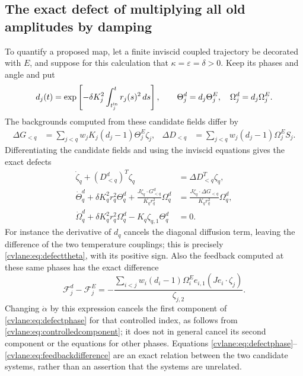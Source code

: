 \subsection{The exact defect of multiplying all old amplitudes by damping}
To quantify a proposed map, let a finite inviscid coupled trajectory
be decorated with $E$, and suppose for this calculation that
$\kappa=\varepsilon=\delta>0$. Keep its phases and angle and put
\[
 d_j(t)=\exp\left[-\delta K_j^2
 \int_{t_j^{\rm in}}^t r_j(s)^2\,ds\right],\qquad
 \Theta_j^d=d_j\Theta_j^E,\quad\Omega_j^d=d_j\Omega_j^E.
\]
The backgrounds computed from these candidate fields differ by
\begin{align}
 \Delta G_{<q}&=\sum_{j<q}w_jK_j(d_j-1)\Theta_j^E\zeta_j,
 &\Delta D_{<q}&=\sum_{j<q}w_j(d_j-1)\Omega_j^ES_j.
 \label{cvlane:eq:dampingdefectbackground}
\end{align}
Differentiating the candidate fields and using the inviscid
equations gives the exact defects
\begin{align}
 \dot\zeta_q+(D^d_{<q})^T\zeta_q
 &=\Delta D_{<q}^T\zeta_q,\label{cvlane:eq:defectphase}\\
 \dot\Theta_q^d+\delta K_q^2r_q^2\Theta_q^d
 +\frac{J\zeta_q\cdot G^d_{<q}}{K_qr_q^2}\Omega_q^d
 &=\frac{J\zeta_q\cdot\Delta G_{<q}}{K_qr_q^2}\Omega_q^d,
 \label{cvlane:eq:defecttheta}\\
 \dot\Omega_q^d+\delta K_q^2r_q^2\Omega_q^d
 -K_q\zeta_{q,1}\Theta_q^d&=0.\label{cvlane:eq:defectomega}
\end{align}
For instance the derivative of $d_q$ cancels the diagonal
diffusion term, leaving the difference of the two temperature
couplings; this is precisely \eqref{cvlane:eq:defecttheta}, with its
positive sign. Also the feedback computed at these same phases
has the exact difference
\begin{equation}
 \mathcal F_j^d-\mathcal F_j^E
 =-\frac{\sum_{i<j}w_i(d_i-1)\Omega_i^Ee_{i,1}
 (Je_i\cdot\zeta_j)}{\zeta_{j,2}}.
 \label{cvlane:eq:feedbackdifference}
\end{equation}
Changing $\dot\alpha$ by this expression cancels the first
component of \eqref{cvlane:eq:defectphase} for that controlled index,
as follows from \eqref{cvlane:eq:controlledcomponent}; it does not in
general cancel its second component or the equations for other
phases. Equations \eqref{cvlane:eq:defectphase}--\eqref{cvlane:eq:feedbackdifference}
are an exact relation between the two candidate systems, rather
than an assertion that the systems are unrelated.

